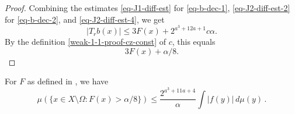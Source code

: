 \begin{proof}
Combining the estimates \eqref{eq-J1-diff-est} for \eqref{eq-b-dec-1}, \eqref{eq-J2-diff-est-2} for \eqref{eq-b-dec-2}, and \eqref{eq-J2-diff-est-4}, we get
\begin{equation*}
    |T_rb(x)|\leq 3F(x)+2^{a^3+12a+1}c\alpha.
\end{equation*}
By the definition \eqref{weak-1-1-proof-cz-const} of $c$, this equals
\begin{equation*}
    3F(x)+\alpha/8.
\end{equation*}
\end{proof}

\begin{lemma}
    \label{estimate-F-set}
    \leanok
    For $F$ as defined in , we have
    \begin{equation}
        \label{eq-F-X-minus-Omega}
        \mu(\{x\in X\setminus\Omega: F(x)>\alpha/8\}) \le \frac{2^{a^3+11a+4}}{\alpha} \int |f(y)|\,d\mu(y)\,.
    \end{equation}
\end{lemma}

